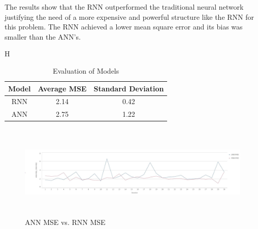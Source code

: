 The results show that the RNN outperformed the traditional neural network justifying the need of a more expensive and powerful structure like the RNN for this problem. The RNN achieved a lower mean square error and its bias was smaller than the ANN's.

\begin{table}{H}
\begin{center}
\begin{tabular}{ c | c | c }
    \hline
     \textbf{Model} &  \textbf{Average MSE} &    \textbf{Standard Deviation}\\ \hline
    RNN&  2.14&  0.42 \\ \hline
    ANN&  2.75&  1.22\\ \hline
      \hline
  \end{tabular}
\caption{Evaluation of Models}
 \label{table:nnRnn}
\end{center}
 \end{table}
\begin{figure}
\label{fig:errors}
\center
\includegraphics[width=12cm,height=4.5cm]{Figures/errors.JPG}
\caption{ANN MSE vs. RNN MSE}
\end{figure}

 
 

 
 
